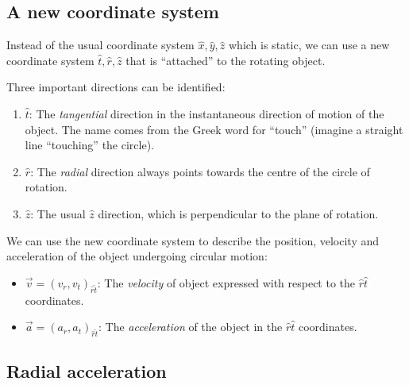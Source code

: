 \documentclass[letterpaper,9pt,journal]{IEEEtran}
\newcommand{\dokuitalic}[1]{\textsl{#1}}
\newcommand{\dokuitem}{\item}
\begin{document}
\subsection{A new coordinate system}
\label{7194f08cce3613f8375fbc7dc78ba314}%

Instead of the usual coordinate system $\hat{x},\hat{y},\hat{z}$ which is static, 
we can use a new coordinate system $\hat{t},\hat{r},\hat{z}$ that is ``attached'' to the rotating object.

Three important directions can be identified:
\begin{enumerate}\dokuitem  $\hat{t}$: The \dokuitalic{tangential} direction in the instantaneous direction of motion of the object. The name comes from the Greek word for ``touch'' (imagine a straight line ``touching'' the circle).
\dokuitem  $\hat{r}$: The \dokuitalic{radial} direction always points towards the centre of the circle of rotation.
\dokuitem  $\hat{z}$: The usual $\hat{z}$ direction, which is perpendicular to the plane of rotation. 
\end{enumerate}
%

We can use the new coordinate system to describe the position, velocity and acceleration 
of the object undergoing circular motion:
\begin{itemize}
\dokuitem  $\vec{v}=(v_r,v_t)_{\hat{r}\hat{t}}$: The \dokuitalic{velocity} of object expressed with respect to  the $\hat{r}\hat{t}$ coordinates.
\dokuitem  $\vec{a}=(a_r,a_t)_{\hat{r}\hat{t}}$: The \dokuitalic{acceleration} of the object in the $\hat{r}\hat{t}$ coordinates.
\end{itemize}
%


\vspace{-3mm}
\subsection{Radial acceleration}
\end{document}
